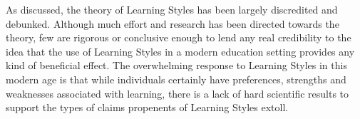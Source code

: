 \documentclass[12pt]{report}
\begin{document}
\begin{paragraph}
    As discussed, the theory of Learning Styles has been largely discredited and debunked.
    Although much effort and research has been directed towards the theory, few are rigorous or conclusive enough to lend any real credibility to the idea that the use of Learning Styles in a modern education setting provides any kind of beneficial effect.
    The overwhelming response to Learning Styles in this modern age is that while individuals certainly have preferences, strengths and weaknesses associated with learning, there is a lack of hard scientific results to support the types of claims propenents of Learning Styles extoll.
\end{paragraph}
\end{document}
